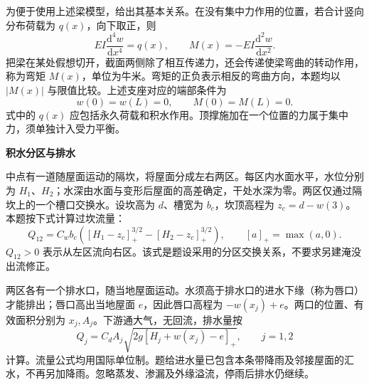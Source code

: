 \documentclass[11pt,a4paper]{article}
\begin{document}
为便于使用上述梁模型，给出其基本关系。在没有集中力作用的位置，若合计竖向分布荷载为 $q(x)$，向下取正，则
\[
EI\frac{\mathrm d^4w}{\mathrm dx^4}=q(x),\qquad
M(x)=-EI\frac{\mathrm d^2w}{\mathrm dx^2}.
\]
把梁在某处假想切开，截面两侧除了相互传递力，还会传递使梁弯曲的转动作用，称为弯矩 $M(x)$，单位为牛米。弯矩的正负表示相反的弯曲方向，本题均以 $|M(x)|$ 与限值比较。上述支座对应的端部条件为
\[
w(0)=w(L)=0,\qquad M(0)=M(L)=0.
\]
式中的 $q(x)$ 应包括永久荷载和积水作用。顶撑施加在一个位置的力属于集中力，须单独计入受力平衡。

\newpage
\begin{center}{\large\bfseries 积水分区与排水}\end{center}

中点有一道随屋面运动的隔坎，将屋面分成左右两区。每区内水面水平，水位分别为 $H_1$、$H_2$；水深由水面与变形后屋面的高差确定，干处水深为零。两区仅通过隔坎上的一个槽口交换水。设坎高为 $d$、槽宽为 $b_c$，坎顶高程为 $z_c=d-w(3)$。本题按下式计算过坎流量：
\[
Q_{12}=C_w b_c\left([H_1-z_c]_+^{3/2}-[H_2-z_c]_+^{3/2}\right),
\qquad [a]_+=\max(a,0).
\]
$Q_{12}>0$ 表示从左区流向右区。该式是题设采用的分区交换关系，不要求另建淹没出流修正。

两区各有一个排水口，随当地屋面运动。水须高于排水口的进水下缘（称为唇口）才能排出；唇口高出当地屋面 $e$，因此唇口高程为 $-w(x_j)+e$。两口的位置、有效面积分别为 $x_j,A_j$。下游通大气，无回流，排水量按
\[
Q_j=C_d A_j\sqrt{2g[H_j+w(x_j)-e]_+},\qquad j=1,2
\]
计算。流量公式均用国际单位制。题给进水量已包含本条带降雨及邻接屋面的汇水，不再另加降雨。忽略蒸发、渗漏及外缘溢流，停雨后排水仍继续。

\begin{center}
\end{center}
\end{document}
